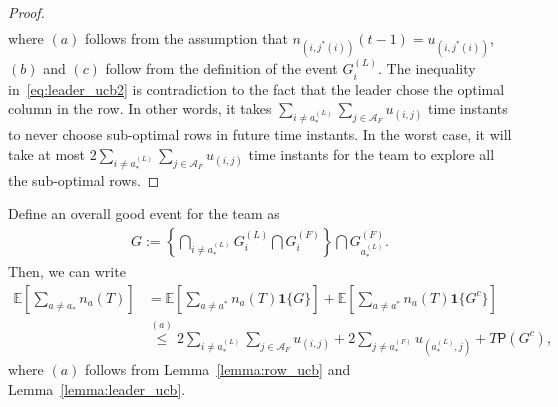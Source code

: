\documentclass[letterpaper]{article} %
\theoremstyle{definition}
\def\expe{\mathbb{E}}   %
\def\P{\mathsf{P}}   %
\def\mc{\mathcal}
\newcommand{\indicate}[1]{\mathbf{1}{\{#1\}}}
\begin{document}
\begin{proof}
\begin{align}
    \label{eq:leader_ucb2}
\end{align}
where $(a)$ follows from the assumption that $n_{(i, j^{\ast}(i))}(t-1) = u_{(i, j^{\ast}(i))}$, $(b)$ and $(c)$ follow from the definition of the event $G^{(L)}_{i}$. The inequality in~\eqref{eq:leader_ucb2} is contradiction to the fact that the leader chose the optimal column in the row.  In other words, it takes $\sum_{i \neq a^{(L)}_{\ast}} \sum_{j \in \mc{A}_F} u_{(i,j)}$ time instants to never choose sub-optimal rows in future time instants. In the worst case, it will take at most $2\sum_{i \neq a^{(L)}_{\ast}} \sum_{j \in \mc{A}_F} u_{(i,j)}$ time instants for the team to explore all the sub-optimal rows. 
\end{proof}


Define an overall good event for the team as 
\begin{align}
    G:= \left\{\bigcap_{i \neq a^{(L)}_{\ast}} G^{(L)}_i \bigcap G^{(F)}_i \right\} \bigcap G^{(F)}_{a^{(L)}_{\ast}}.
\end{align}
Then, we can write
\begin{align}
    \expe\left[\sum_{a \neq a_{\ast}}n_{a}(T)\right] &= \expe\left[\sum_{a \neq a^{\ast}} n_{a}(T)\indicate{G}\right] + \expe\left[\sum_{a \neq a^{\ast}} n_{a}(T)\indicate{G^c}\right]
    \\
    & \overset{(a)}\leq 2 \sum_{i \neq a^{(L)}_{\ast}}\sum_{j \in \mc{A}_F} u_{(i,j)}
    + 2 \sum_{j \neq a^{(F)}_{\ast}} u_{(a^{(L)}_{\ast},j)}
    + T \P(G^c),
    \label{eq:num_sub_opt_arms}
\end{align}
where $(a)$ follows from Lemma~\ref{lemma:row_ucb} and Lemma~\ref{lemma:leader_ucb}.
\end{document}
